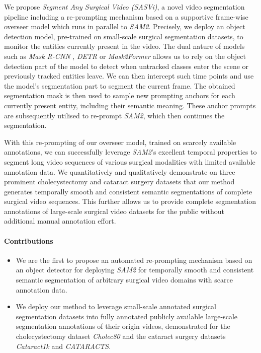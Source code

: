 We propose \emph{Segment Any Surgical Video (SASVi)}, a novel video segmentation pipeline including a re-prompting mechanism based on a supportive frame-wise overseer model which runs in parallel to \emph{SAM2}. Precisely, we deploy an object detection model, pre-trained on small-scale surgical segmentation datasets, to monitor the entities currently present in the video. The dual nature of models such as \textit{Mask R-CNN} \cite{he2017mask}, \emph{DETR} \cite{carion2020end} or \emph{Mask2Former} \cite{cheng2022masked} allows us to rely on the object detection part of the model to detect when untracked classes enter the scene or previously tracked entities leave. We can then intercept such time points and use the model's segmentation part to segment the current frame. The obtained segmentation mask is then used to sample new prompting anchors for each currently present entity, including their semantic meaning. These anchor prompts are subsequently utilised to re-prompt \emph{SAM2}, which then continues the segmentation.

With this re-prompting of our overseer model, trained on scarcely available annotations, we can successfully leverage \emph{SAM2}'s excellent temporal properties to segment long video sequences of various surgical modalities with limited available annotation data. We quantitatively and qualitatively demonstrate on three prominent cholecystectomy and cataract surgery datasets that our method generates temporally smooth and consistent semantic segmentations of complete surgical video sequences. This further allows us to provide complete segmentation annotations of large-scale surgical video datasets for the public without additional manual annotation effort. 

\paragraph{Contributions}
\begin{itemize}
    \item We are the first to propose an automated re-prompting mechanism based on an object detector for deploying \emph{SAM2} for temporally smooth and consistent semantic segmentation of arbitrary surgical video domains with scarce annotation data.
    \item We deploy our method to leverage small-scale annotated surgical segmentation datasets into fully annotated publicly available large-scale segmentation annotations of their origin videos, demonstrated for the cholecystectomy dataset \emph{Cholec80} and the cataract surgery datasets \emph{Cataract1k} and  \emph{CATARACTS}. 
\end{itemize}
